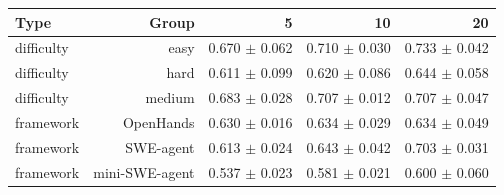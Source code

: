 \begin{tabular}{lrrrr}
\toprule
Type & Group & 5 & 10 & 20 \\
\midrule
difficulty & easy & 0.670 $\pm$ 0.062 & 0.710 $\pm$ 0.030 & 0.733 $\pm$ 0.042 \\
difficulty & hard & 0.611 $\pm$ 0.099 & 0.620 $\pm$ 0.086 & 0.644 $\pm$ 0.058 \\
difficulty & medium & 0.683 $\pm$ 0.028 & 0.707 $\pm$ 0.012 & 0.707 $\pm$ 0.047 \\
framework & OpenHands & 0.630 $\pm$ 0.016 & 0.634 $\pm$ 0.029 & 0.634 $\pm$ 0.049 \\
framework & SWE-agent & 0.613 $\pm$ 0.024 & 0.643 $\pm$ 0.042 & 0.703 $\pm$ 0.031 \\
framework & mini-SWE-agent & 0.537 $\pm$ 0.023 & 0.581 $\pm$ 0.021 & 0.600 $\pm$ 0.060 \\
\bottomrule
\end{tabular}
